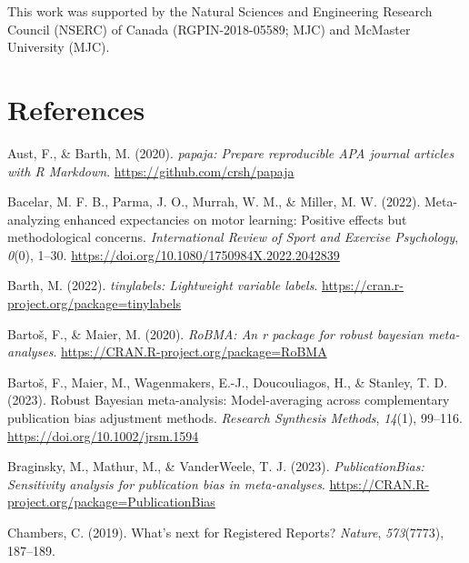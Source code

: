 \documentclass[
  11pt,
  doc, donotrepeattitle,floatsintext]{apa7}
\newlength{\cslhangindent}
\newlength{\cslentryspacingunit} %
\newenvironment{CSLReferences}[2] %
 {%
  \setlength{\parindent}{0pt}
  \ifodd #1
  \let\oldpar\par
  \def\par{\hangindent=\cslhangindent\oldpar}
  \fi
  \setlength{\parskip}{#2\cslentryspacingunit}
 }%
 {}
\begin{document}
\noindent This work was supported by the Natural Sciences and Engineering Research Council (NSERC) of Canada (RGPIN-2018-05589; MJC) and McMaster University (MJC).

\newpage

\hypertarget{references}{%
\section{References}\label{references}}

\vspace{2ex}

\hypertarget{refs}{}
\begin{CSLReferences}{1}{0}
\leavevmode{}%
Aust, F., \& Barth, M. (2020). \emph{{papaja}: {Prepare} reproducible {APA} journal articles with {R Markdown}}. \url{https://github.com/crsh/papaja}

\leavevmode{}%
Bacelar, M. F. B., Parma, J. O., Murrah, W. M., \& Miller, M. W. (2022). Meta-analyzing enhanced expectancies on motor learning: Positive effects but methodological concerns. \emph{International Review of Sport and Exercise Psychology}, \emph{0}(0), 1--30. \url{https://doi.org/10.1080/1750984X.2022.2042839}

\leavevmode{}%
Barth, M. (2022). \emph{{tinylabels}: Lightweight variable labels}. \url{https://cran.r-project.org/package=tinylabels}

\leavevmode{}%
Bartoš, F., \& Maier, M. (2020). \emph{RoBMA: An r package for robust bayesian meta-analyses}. \url{https://CRAN.R-project.org/package=RoBMA}

\leavevmode{}%
Bartoš, F., Maier, M., Wagenmakers, E.-J., Doucouliagos, H., \& Stanley, T. D. (2023). Robust {Bayesian} meta-analysis: {Model-averaging} across complementary publication bias adjustment methods. \emph{Research Synthesis Methods}, \emph{14}(1), 99--116. \url{https://doi.org/10.1002/jrsm.1594}

\leavevmode{}%
Braginsky, M., Mathur, M., \& VanderWeele, T. J. (2023). \emph{PublicationBias: Sensitivity analysis for publication bias in meta-analyses}. \url{https://CRAN.R-project.org/package=PublicationBias}

\leavevmode{}%
Chambers, C. (2019). What's next for {Registered Reports}? \emph{Nature}, \emph{573}(7773), 187--189.


\end{CSLReferences}
\end{document}
